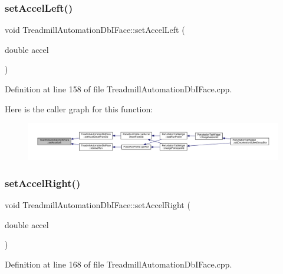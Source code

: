 \subsubsection{\texorpdfstring{set\+Accel\+Left()}{setAccelLeft()}}
{\footnotesize\ttfamily void Treadmill\+Automation\+Db\+I\+Face\+::set\+Accel\+Left (\begin{DoxyParamCaption}\item[{double}]{accel }\end{DoxyParamCaption})}



Definition at line 158 of file Treadmill\+Automation\+Db\+I\+Face.\+cpp.

Here is the caller graph for this function\+:
\nopagebreak
\begin{figure}[H]
\begin{center}
\leavevmode
\includegraphics[width=350pt]{class_treadmill_automation_db_i_face_a14273054d1236eb6a2cd0db13037a4e9_icgraph}
\end{center}
\end{figure}
\mbox{\label{class_treadmill_automation_db_i_face_a8c58d70ef6116fca1ca12357dece5511}} 
\subsubsection{\texorpdfstring{set\+Accel\+Right()}{setAccelRight()}}
{\footnotesize\ttfamily void Treadmill\+Automation\+Db\+I\+Face\+::set\+Accel\+Right (\begin{DoxyParamCaption}\item[{double}]{accel }\end{DoxyParamCaption})}



Definition at line 168 of file Treadmill\+Automation\+Db\+I\+Face.\+cpp.

